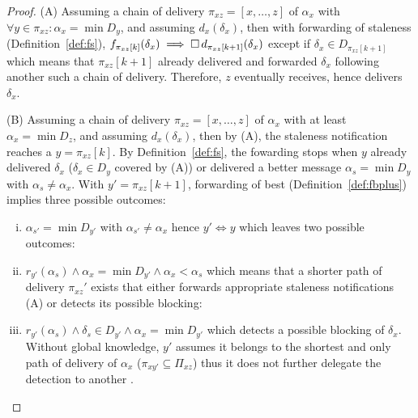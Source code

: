 \begin{proof}
  (A) Assuming a chain of delivery $\pi_{xz} = [x, \ldots, z]$ of
  $\alpha_x$ with $\forall y \in \pi_{xz}: \alpha_x = \min D_y$, and
  assuming $d_x(\delta_x)$, then with forwarding of staleness
  (Definition~\ref{def:fs}),
  $f_{\pi_{xz}[k]}(\delta_x) \implies \square\,
  d_{\pi_{xz}[k+1]}(\delta_x)$ except if $\delta_x \in D_{\pi_{xz}[k+1]}$ which
  means that $\pi_{xz}[k+1]$ already delivered and forwarded $\delta_x$
  following another such a chain of delivery. Therefore, $z$
  eventually receives, hence delivers $\delta_x$.

  \noindent (B) Assuming a chain of delivery
  $\pi_{xz} = [x, \ldots, z]$ of $\alpha_x$ with at least
  $\alpha_x = \min D_z$, and assuming $d_x(\delta_x)$, then by (A),
  the staleness notification reaches a \process $ y = \pi_{xz}[k]$. By
  Definition~\ref{def:fs}, the fowarding stops when $y$ already
  delivered $\delta_x$ ($\delta_x \in D_y$ covered by (A)) or
  delivered a better message $\alpha_s = \min D_y$ with
  $\alpha_s \neq \alpha_x$. With $y'=\pi_{xz}[k+1]$, forwarding of
  best (Definition~\ref{def:fbplus}) implies three possible outcomes:
  \begin{enumerate}[(i)]
  \item $\alpha_{s'} = \min D_{y'}$ with $\alpha_{s'} \neq \alpha_x$
    hence $y' \iff y$ which leaves two possible outcomes:
  \item
    $r_{y'}(\alpha_s) \wedge \alpha_x = \min D_{y'} \wedge \alpha_x <
    \alpha_s$ which means that a shorter path of delivery $\pi_{xz}'$
    exists that either forwards appropriate staleness notifications
    (A) or detects its possible blocking:
  \item
    $r_{y'}(\alpha_s) \wedge \delta_s \in D_{y'} \wedge \alpha_x =
    \min D_{y'}$ which detects a possible blocking of
    $\delta_x$. Without global knowledge, $y'$ assumes it belongs to
    the shortest and only path of delivery of $\alpha_x$
    ($\pi_{xy'} \subseteq \Pi_{xz}$) thus it does not further delegate
    the detection to another \process.
  \end{enumerate} \vspace{-1.5em} %

\end{proof}
